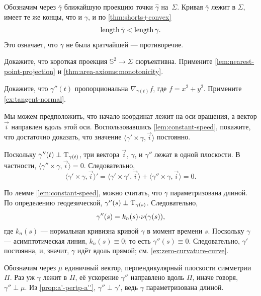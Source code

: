 \begin{multicols}{2}
Обозначим через $\bar\gamma$ ближайшую проекцию точки $\hat\gamma$ на~$\Sigma$.
Кривая $\bar\gamma$ лежит в $\Sigma$, 
имеет те же концы, что и $\gamma$,
и по \ref{thm:shorts+convex}
\[\mathop{\rm length}\nolimits\bar\gamma<\mathop{\rm length}\nolimits\gamma.\]
Это означает, что $\gamma$ не была кратчайшей --- 
противоречие.

Докажите, что короткая проекция $\mathbb{S}^2\to\Sigma$ сюръективна.
Примените \ref{lem:nearest-point-projection} и \ref{thm:area-axioms:monotonicity}.


\setcounter{eqtn}{0}

Докажите, что $\gamma''(t)$ пропорциональна $\nabla_{\gamma(t)} f$, где $f=x^2+y^2$. 
Примените \ref{ex:tangent-normal}.

Мы можем предположить, что начало координат лежит на оси вращения, а вектор $\vec i$ направлен вдоль этой оси.
Воспользовавшись \ref{lem:constant-speed}, покажите, что достаточно доказать, что 
значение $\langle\gamma'\times \gamma,\vec i\rangle$ постоянно.

Поскольку $\gamma''(t)\perp\mathrm{T}_{\gamma(t)}$, три вектора $\vec i$, $\gamma$, и $\gamma''$ лежат в одной плоскости.
В частности, $\langle\gamma''\times \gamma,\vec i\rangle=0$.
Следовательно,
\[
\langle\gamma'\times \gamma,\vec i\rangle'
=
\langle\gamma'\times \gamma',\vec i\rangle+\langle\gamma''\times \gamma,\vec i\rangle =0
.\]

По лемме \ref{lem:constant-speed}, можно считать, что $\gamma$ параметризована длиной.
По определению геодезической, $\gamma''(s)\perp\mathrm{T}_{\gamma(s)}$. 
Следовательно, 
\[\gamma''(s)=k_n(s)\cdot\Norm(\gamma(s)),\]
где $k_n(s)$ --- нормальная кривизна кривой $\gamma$ в момент времени $s$.
Поскольку $\gamma$ --- асимптотическая линия, $k_n(s)\equiv 0$;
то есть $\gamma''(s)\equiv 0$.
Следовательно, $\gamma'$ постоянна, и, значит, $\gamma$ идёт вдоль прямой; см. \ref{ex:zero-curvature-curve}.

Обозначим через $\mu$ единичный вектор, перпендикулярный плоскости симметрии $\Pi$.
Раз уж $\gamma$ лежит в $\Pi$, её ускорение $\gamma''$ направлено вдоль $\Pi$, иначе говоря, $\gamma''\perp \mu$.
Из \ref{prop:a'-pertp-a''}, $\gamma''\perp\gamma'$, ведь $\gamma$ параметризована длиной.


\end{multicols}
